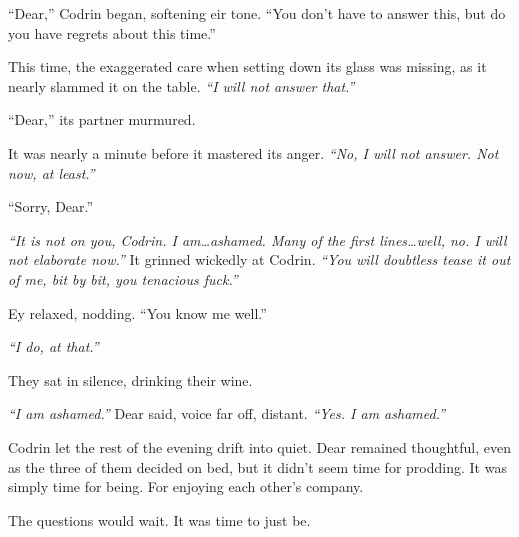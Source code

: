 ``Dear,'' Codrin began, softening eir tone. ``You don't have to answer this, but do you have regrets about this time.''

This time, the exaggerated care when setting down its glass was missing, as it nearly slammed it on the table. \emph{``I will not answer that.''}

``Dear,'' its partner murmured.

It was nearly a minute before it mastered its anger. \emph{``No, I will not answer. Not now, at least.''}

``Sorry, Dear.''

\emph{``It is not on you, Codrin. I am\ldots ashamed. Many of the first lines\ldots well, no. I will not elaborate now.''} It grinned wickedly at Codrin. \emph{``You will doubtless tease it out of me, bit by bit, you tenacious fuck.''}

Ey relaxed, nodding. ``You know me well.''

\emph{``I do, at that.''}

They sat in silence, drinking their wine.

\emph{``I am ashamed.''} Dear said, voice far off, distant. \emph{``Yes. I am ashamed.''}

Codrin let the rest of the evening drift into quiet. Dear remained thoughtful, even as the three of them decided on bed, but it didn't seem time for prodding. It was simply time for being. For enjoying each other's company.

The questions would wait. It was time to just be.
